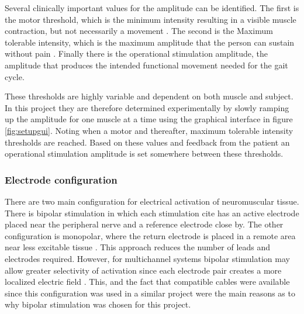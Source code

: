 Several clinically important values for the amplitude can be identified. The first is the motor threshold, which is the minimum intensity resulting in a visible muscle contraction, but not necessarily a movement \cite{marquez-chin_functional_2020}. The second is the Maximum tolerable intensity, which is the maximum amplitude that the person can sustain without pain \cite{marquez-ching_funcitonal_2020}. Finally there is the operational stimulation amplitude, the amplitude that produces the intended functional movement needed for the gait cycle. 

These thresholds are highly variable and dependent on both muscle and subject. In this project they are therefore determined experimentally by slowly ramping up the amplitude for one muscle at a time using the graphical interface in figure \ref{fig:setupgui}. Noting when a motor and thereafter, maximum tolerable intensity thresholds are reached. Based on these values and feedback from the patient an operational stimulation amplitude is set somewhere between these thresholds. 



\subsubsection{Electrode configuration}
There are two main configuration for electrical activation of neuromuscular tissue. There is bipolar stimulation in which each stimulation cite has an active electrode placed near the peripheral nerve and a reference electrode close by. The other configuration is monopolar, where the return electrode is placed in a remote area near less excitable tissue \cite{peckham_functional_2005}. 
This approach reduces the number of leads and electrodes required. However, for multichannel systems bipolar stimulation may allow greater selectivity of activation since each electrode pair creates a more localized electric field \cite{grandjean_recruitment_1986}. This, and the fact that compatible cables were available since this configuration was used in a similar project were the main reasons as to why bipolar stimulation was chosen for this project.

